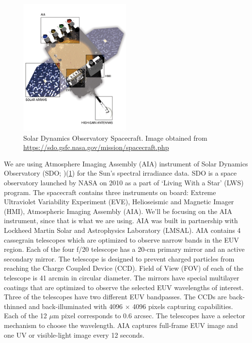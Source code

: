 \begin{figure}[h!]
    \centering
    \includegraphics[width=0.5\textwidth]{images/spacecraft_detailed.jpg}
    \caption[SDO Spacecraft]{Solar Dynamics Observatory Spacecraft.
      Image obtained from {\url{https://sdo.gsfc.nasa.gov/mission/spacecraft.php}}}
    \label{fig:sdo_spacecraft}
\end{figure}

We are using Atmosphere Imaging Assembly (AIA) instrument of Solar Dynamics Observatory (SDO; \citep{Pesnell2011})(\cref{fig:sdo_spacecraft}) for the Sun's spectral irradiance data. SDO is a space observatory launched by NASA on 2010 as a part of `Living With a Star' (LWS) program. The spacecraft contains three instruments on board: Extreme Ultraviolet Variability Experiment (EVE), Helioseismic and Magnetic Imager (HMI), Atmospheric Imaging Assembly (AIA). We'll be focusing on the AIA instrument, since that is what we are using. AIA was built in partnership with Lockheed Martin Solar and Astrophysics Laboratory (LMSAL). AIA contains 4 cassegrain telescopes which are optimized to observe narrow bands in the EUV region. Each of the four f/20 telescope has a 20-cm primary mirror and an active secondary mirror. The telescope is designed to prevent charged particles from reaching the Charge Coupled Device (CCD). Field of View (FOV) of each of the telescope is 41 arcmin in circular diameter. The mirrors have special multilayer coatings that are optimized to observe the selected EUV wavelengths of interest. Three of the telescopes have two different EUV bandpasses. The CCDs are back-thinned and back-illuminated with 4096 $\times$ 4096 pixels capturing capabilities. Each of the 12 $\mu$m pixel corresponds to 0.6 arcsec. The telescopes have a selector mechanism to choose the wavelength. AIA captures full-frame EUV image and one UV or visible-light image every 12 seconds. \citep{Lemen2011}\\

